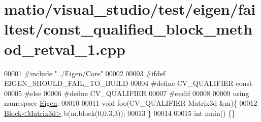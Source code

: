 \hypertarget{matio_2visual__studio_2test_2eigen_2failtest_2const__qualified__block__method__retval__1_8cpp_source}{}\section{matio/visual\+\_\+studio/test/eigen/failtest/const\+\_\+qualified\+\_\+block\+\_\+method\+\_\+retval\+\_\+1.cpp}
\label{matio_2visual__studio_2test_2eigen_2failtest_2const__qualified__block__method__retval__1_8cpp_source}

\begin{DoxyCode}
00001 \textcolor{preprocessor}{#include "../Eigen/Core"}
00002 
00003 \textcolor{preprocessor}{#ifdef EIGEN\_SHOULD\_FAIL\_TO\_BUILD}
00004 \textcolor{preprocessor}{#define CV\_QUALIFIER const}
00005 \textcolor{preprocessor}{#else}
00006 \textcolor{preprocessor}{#define CV\_QUALIFIER}
00007 \textcolor{preprocessor}{#endif}
00008 
00009 \textcolor{keyword}{using namespace }\hyperlink{namespace_eigen}{Eigen};
00010 
00011 \textcolor{keywordtype}{void} foo(CV\_QUALIFIER Matrix3d &m)\{
00012     \hyperlink{group___core___module_class_eigen_1_1_block}{Block<Matrix3d>} b(m.block(0,0,3,3));
00013 \}
00014 
00015 \textcolor{keywordtype}{int} main() \{\}
\end{DoxyCode}
